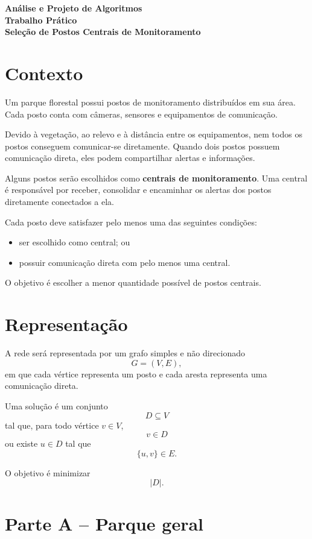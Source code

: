 \documentclass[11pt,a4paper]{article}
\begin{document}
\begin{center}
    {\Large \textbf{Análise e Projeto de Algoritmos}}\\[0.5em]
    {\large \textbf{Trabalho Prático}}\\[0.5em]
    {\LARGE \textbf{Seleção de Postos Centrais de Monitoramento}}
\end{center}

\section{Contexto}

Um parque florestal possui postos de monitoramento distribuídos em sua área. Cada posto conta com câmeras, sensores e equipamentos de comunicação.

Devido à vegetação, ao relevo e à distância entre os equipamentos, nem todos os postos conseguem comunicar-se diretamente. Quando dois postos possuem comunicação direta, eles podem compartilhar alertas e informações.

Alguns postos serão escolhidos como \textbf{centrais de monitoramento}. Uma central é responsável por receber, consolidar e encaminhar os alertas dos postos diretamente conectados a ela.

Cada posto deve satisfazer pelo menos uma das seguintes condições:

\begin{itemize}
    \item ser escolhido como central; ou
    \item possuir comunicação direta com pelo menos uma central.
\end{itemize}

O objetivo é escolher a menor quantidade possível de postos centrais.

\section{Representação}

A rede será representada por um grafo simples e não direcionado
\[
G=(V,E),
\]
em que cada vértice representa um posto e cada aresta representa uma comunicação direta.

Uma solução é um conjunto
\[
D\subseteq V
\]
tal que, para todo vértice $v\in V$,
\[
v\in D
\]
ou existe $u\in D$ tal que
\[
\{u,v\}\in E.
\]

O objetivo é minimizar
\[
|D|.
\]

\section{Parte A -- Parque geral}
\end{document}
